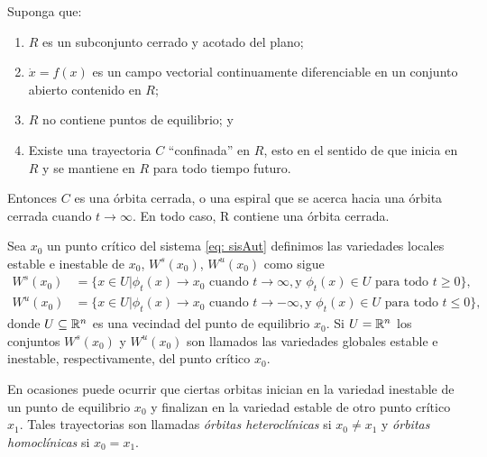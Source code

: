 \begin{teo}\label{teo: poincareB}
	Suponga que:
	\begin{enumerate}
		\item $R$ es un subconjunto cerrado y acotado del plano;
		\item $\dot{x} = f(x)$ es un campo vectorial continuamente diferenciable en un conjunto abierto contenido en $R$;
		\item $R$ no contiene puntos de equilibrio; y
		\item Existe una trayectoria $C$ ``confinada'' en $R$, esto en el sentido de que inicia en $R$ y se mantiene en $R$ para todo tiempo futuro. 
	\end{enumerate}
	Entonces $C$ es una órbita cerrada, o una espiral que se acerca hacia una órbita cerrada cuando $t \rightarrow \infty$. En todo caso, R contiene una órbita cerrada.
\end{teo}

\begin{defi}
	Sea $x_{0}$ un punto crítico del sistema \eqref{eq: sisAut} definimos las variedades locales estable e inestable de $x_{0}$, $W^{s}(x_{0})$, $W^{u}(x_{0})$ como sigue
	\begin{equation*}
		\begin{aligned}
			W^{s}(x_{0}) &= \{ x\in U | \phi_{t}(x) \rightarrow x_{0} \text{ cuando } t\rightarrow \infty, \text{y } \phi_{t}(x)\in U \text{ para todo } t\geq 0 \}, \\
			W^{u}(x_{0}) &= \{ x\in U | \phi_{t}(x) \rightarrow x_{0} \text{ cuando } t\rightarrow -\infty, \text{y } \phi_{t}(x)\in U \text{ para todo } t \leq 0 \},
		\end{aligned}
	\end{equation*}
	donde $U \subseteq {\mathbb{R}}^{n}$ es una vecindad del punto de equilibrio $x_{0}$. Si $U = {\mathbb{R}}^{n}$ los conjuntos $W^{s}(x_{0})$ y $W^{u}(x_{0})$ son llamados las variedades globales estable e inestable, respectivamente, del punto crítico $x_{0}$. 
\end{defi}

En ocasiones puede ocurrir que ciertas orbitas inician en la variedad inestable de un punto de equilibrio $x_{0}$ y finalizan en la variedad estable de otro punto crítico $x_{1}$. Tales trayectorias son llamadas \textit{órbitas heteroclínicas} si $x_{0} \neq x_{1}$ y \textit{órbitas homoclínicas} si $x_{0} = x_{1}$.    

